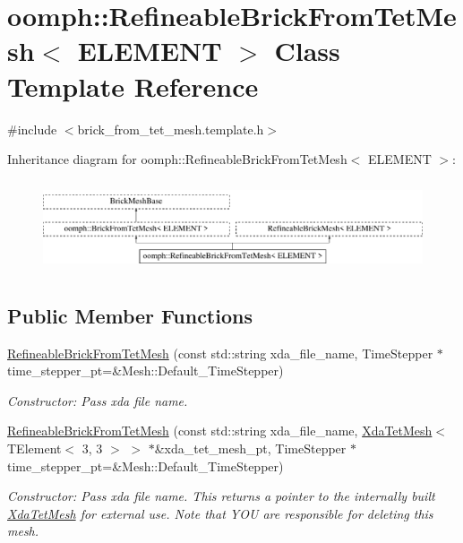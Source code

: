\hypertarget{classoomph_1_1RefineableBrickFromTetMesh}{}\section{oomph\+:\+:Refineable\+Brick\+From\+Tet\+Mesh$<$ E\+L\+E\+M\+E\+NT $>$ Class Template Reference}
\label{classoomph_1_1RefineableBrickFromTetMesh}


{\ttfamily \#include $<$brick\+\_\+from\+\_\+tet\+\_\+mesh.\+template.\+h$>$}

Inheritance diagram for oomph\+:\+:Refineable\+Brick\+From\+Tet\+Mesh$<$ E\+L\+E\+M\+E\+NT $>$\+:\begin{figure}[H]
\begin{center}
\leavevmode
\includegraphics[height=2.700965cm]{classoomph_1_1RefineableBrickFromTetMesh}
\end{center}
\end{figure}
\subsection*{Public Member Functions}
\begin{DoxyCompactItemize}
\item 
\hyperlink{classoomph_1_1RefineableBrickFromTetMesh_ad46067054ab0f2d078171060956821b4}{Refineable\+Brick\+From\+Tet\+Mesh} (const std\+::string xda\+\_\+file\+\_\+name, Time\+Stepper $\ast$time\+\_\+stepper\+\_\+pt=\&Mesh\+::\+Default\+\_\+\+Time\+Stepper)
\begin{DoxyCompactList}\small\item\em Constructor\+: Pass xda file name. \end{DoxyCompactList}\item 
\hyperlink{classoomph_1_1RefineableBrickFromTetMesh_a108febc7390d0c449d6dbd4a514c173e}{Refineable\+Brick\+From\+Tet\+Mesh} (const std\+::string xda\+\_\+file\+\_\+name, \hyperlink{classoomph_1_1XdaTetMesh}{Xda\+Tet\+Mesh}$<$ T\+Element$<$ 3, 3 $>$ $>$ $\ast$\&xda\+\_\+tet\+\_\+mesh\+\_\+pt, Time\+Stepper $\ast$time\+\_\+stepper\+\_\+pt=\&Mesh\+::\+Default\+\_\+\+Time\+Stepper)
\begin{DoxyCompactList}\small\item\em Constructor\+: Pass xda file name. This returns a pointer to the internally built \hyperlink{classoomph_1_1XdaTetMesh}{Xda\+Tet\+Mesh} for external use. Note that Y\+OU are responsible for deleting this mesh. \end{DoxyCompactList}\end{DoxyCompactItemize}


